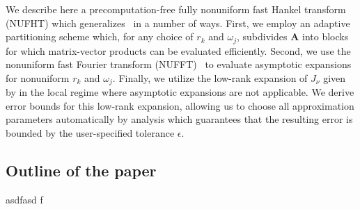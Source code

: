 We describe here a precomputation-free fully nonuniform fast Hankel transform
(NUFHT) which generalizes~\cite{townsend2015fast} in a number of ways. First, we
employ an adaptive partitioning scheme which, for any choice of $r_k$ and
$\omega_j$, subdivides $\bm{A}$ into blocks for which matrix-vector products can
be evaluated efficiently. Second, we use the nonuniform fast Fourier transform
(NUFFT)~\cite{dutt1993fast, greengard2004accelerating} to evaluate asymptotic
expansions for nonuniform $r_k$ and $\omega_j$. Finally, we utilize the low-rank
expansion of $J_\nu$ given by \cite{wimp1962polynomial} in the local regime
where asymptotic expansions are not applicable. We derive error bounds for this
low-rank expansion, allowing us to choose all approximation parameters
automatically by analysis which guarantees that the resulting error is bounded
by the user-specified tolerance $\epsilon$.



\subsection*{Outline of the paper}

asdfasd
f

